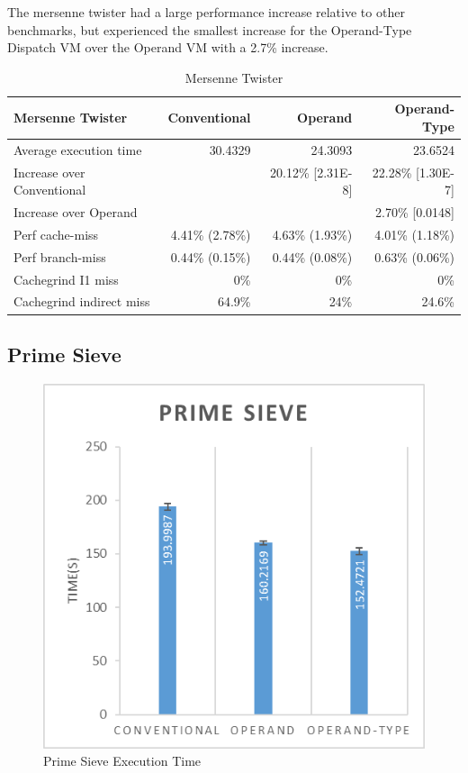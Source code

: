 \documentclass[english,a4paper,12pt]{report}
\begin{document}
The mersenne twister had a large performance increase relative to
other benchmarks, but experienced the smallest increase for the
Operand-Type Dispatch VM over the Operand VM with a 2.7\% increase.

\begin{table}[!htb]
  \begin{center}
    \begin{tabular}{lrrr}
      Mersenne Twister & Conventional & Operand & Operand-Type\\
      \hline
      Average execution time & 30.4329 & 24.3093 & 23.6524\\
      Increase over Conventional &  & 20.12\% [2.31E-8] & 22.28\% [1.30E-7]\\
      Increase over Operand &  &  & 2.70\% [0.0148]\\
      Perf cache-miss & 4.41\% (2.78\%) & 4.63\% (1.93\%) & 4.01\% (1.18\%)\\
      Perf branch-miss & 0.44\% (0.15\%) & 0.44\% (0.08\%) & 0.63\% (0.06\%)\\
      Cachegrind I1 miss & 0\% & 0\% & 0\%\\
      Cachegrind indirect miss & 64.9\% & 24\% & 24.6\%\\
    \end{tabular}
  \end{center}
  \caption{Mersenne Twister}
\end{table}

\subsection{Prime Sieve}

\begin{figure}[!htb]
  \centering
  \includegraphics{primesieve.png}
  \caption{Prime Sieve Execution Time}
  \label{fig:primesieve-time}
\end{figure}
\end{document}

